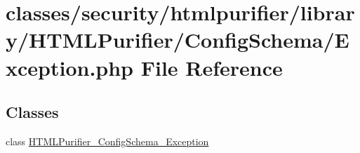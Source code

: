 \hypertarget{ConfigSchema_2Exception_8php}{\section{classes/security/htmlpurifier/library/\+H\+T\+M\+L\+Purifier/\+Config\+Schema/\+Exception.php File Reference}
\label{ConfigSchema_2Exception_8php}
}
\subsection*{Classes}
\begin{DoxyCompactItemize}
\item 
class \hyperlink{classHTMLPurifier__ConfigSchema__Exception}{H\+T\+M\+L\+Purifier\+\_\+\+Config\+Schema\+\_\+\+Exception}
\end{DoxyCompactItemize}
